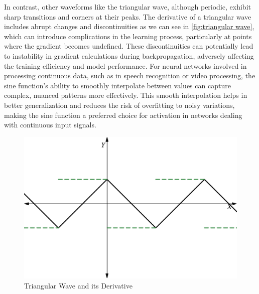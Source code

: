 \documentclass{ioereport}
\begin{document}
    In contrast, other waveforms like the triangular wave, although periodic, exhibit sharp transitions and corners at their peaks. The derivative of a triangular wave includes abrupt changes and discontinuities as we can see in \autoref{fig:triangular wave}, which can introduce complications in the learning process, particularly at points where the gradient becomes undefined. These discontinuities can potentially lead to instability in gradient calculations during backpropagation, adversely affecting the training efficiency and model performance. For neural networks involved in processing continuous data, such as in speech recognition or video processing, the sine function's ability to smoothly interpolate between values can capture complex, nuanced patterns more effectively. This smooth interpolation helps in better generalization and reduces the risk of overfitting to noisy variations, making the sine function a preferred choice for activation in networks dealing with continuous input signals.
    
    \begin{figure}[H]
        \centering
        \includegraphics[height=0.25\textheight]{assets/triangular-wave.png}
        \caption{Triangular Wave and its Derivative}
        \label{fig:triangular wave}
    \end{figure}
    
\end{document}
